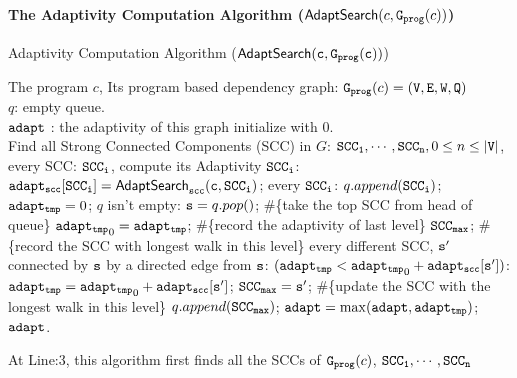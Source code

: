 \paragraph*{The Adaptivity Computation Algorithm ($\mathsf{AdaptSearch}(c, \mathtt{{G_{prog}}}(c))$)}
\begin{algorithm}
    \caption{
    {Adaptivity Computation Algorithm ({$\mathtt{\mathsf{AdaptSearch}(c, \mathtt{{G_{prog}}}(c))}$})}
    \label{alg:adapt}
    }
    \begin{algorithmic}[1]
    \REQUIRE The program $c$, 
    Its program based dependency graph: $\mathtt{{G_{prog}}}(c) = (\mathtt{V}, \mathtt{E}, \mathtt{W}, \mathtt{Q})$
    \\
    $q$: empty queue.
    \\
    $\mathtt{adapt}$ : the adaptivity of this graph initialize with $0$.
    \\
    \STATE Find all Strong Connected Components (SCC) in $G$: $\mathtt{SCC_1}, \cdots, \mathtt{SCC_n}, 0 \leq n \leq |\mathtt{V}|$, 
     every SCC: $\mathtt{SCC_i}$, compute its Adaptivity $\mathtt{SCC_i}$:
    \STATE \quad $\mathtt{adapt_{scc}[SCC_i] = \mathsf{AdaptSearch}_{scc}(c, SCC_i)}$;
     every $\mathtt{SCC_i}$:
    \STATE \qquad $q.append(\mathtt{SCC_i})$;
    \STATE \qquad $\mathtt{adapt_{tmp}} = 0$;
    \STATE {} $q$ isn't empty:
    \STATE \qquad \qquad $\mathtt{s} = q.pop()$;  \#\{take the top SCC from head of queue\}
    \STATE \qquad \qquad  $\mathtt{adapt_{tmp}}_0= \mathtt{adapt_{tmp}}$; \#\{record the adaptivity of last level\}
    \STATE \qquad \qquad  $\mathtt{SCC_{max}}$;  \#\{record the SCC with longest walk in this level\}
    \STATE \qquad {} every 
    different SCC, $\mathtt{s'}$ connected by $\mathtt{s}$ by a directed edge from $\mathtt{s}$:
    \STATE \qquad \qquad {} $(\mathtt{adapt_{tmp}} < \mathtt{adapt_{tmp}}_0 + \mathtt{adapt_{scc}[s']})$:
    \STATE \qquad \qquad \qquad \qquad $\mathtt{adapt_{tmp}} = \mathtt{adapt_{tmp}}_0 + \mathtt{adapt_{scc}[s']}$; 
    \STATE \qquad \qquad \qquad \qquad $\mathtt{SCC_{max} = s'} $; \#\{update the SCC with the longest walk in this level\} 
    \STATE \qquad \qquad \qquad $q.append(\mathtt{SCC_{max}})$;
    \STATE \qquad $\mathtt{adapt} = \max(\mathtt{adapt}, \mathtt{adapt_{tmp}})$;    
    \RETURN $\mathtt{adapt}$.
    \end{algorithmic}
    \end{algorithm}
    At Line:3, this algorithm first finds all the SCCs of $\mathtt{{G_{prog}}}(c)$, $\mathtt{SCC_1}, \cdots, \mathtt{SCC_n}$
